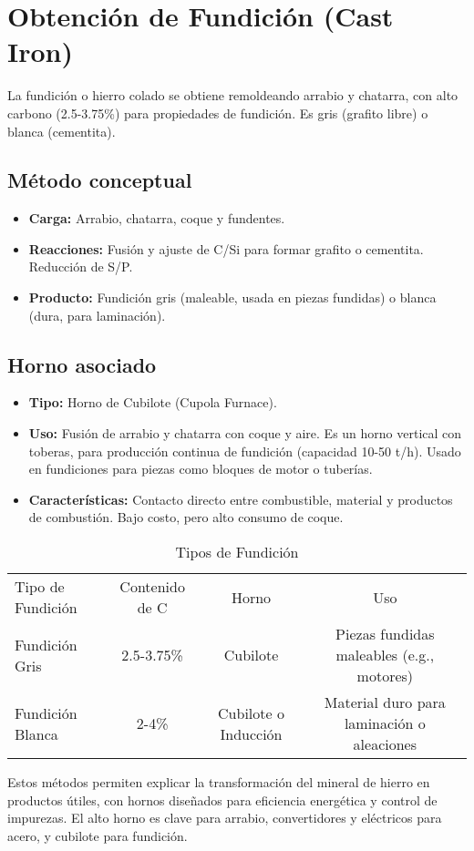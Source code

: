 \documentclass[12pt,a4paper]{article}
\begin{document}
\section{Obtención de Fundición (Cast Iron)}
La fundición o hierro colado se obtiene remoldeando arrabio y chatarra, con alto carbono (2.5-3.75\%) para propiedades de fundición. Es gris (grafito libre) o blanca (cementita).
\subsection{Método conceptual}
\begin{itemize}
\item \textbf{Carga:} Arrabio, chatarra, coque y fundentes.
\item \textbf{Reacciones:} Fusión y ajuste de C/Si para formar grafito o cementita. Reducción de S/P.
\item \textbf{Producto:} Fundición gris (maleable, usada en piezas fundidas) o blanca (dura, para laminación).
\end{itemize}
\subsection{Horno asociado}
\begin{itemize}
\item \textbf{Tipo:} Horno de Cubilote (Cupola Furnace).
\item \textbf{Uso:} Fusión de arrabio y chatarra con coque y aire. Es un horno vertical con toberas, para producción continua de fundición (capacidad 10-50 t/h). Usado en fundiciones para piezas como bloques de motor o tuberías.
\item \textbf{Características:} Contacto directo entre combustible, material y productos de combustión. Bajo costo, pero alto consumo de coque.
\end{itemize}
\begin{table}[h]
\centering
\caption{Tipos de Fundición}
\begin{tabular}{|l|c|c|c|}
Tipo de Fundición & Contenido de C & Horno & Uso \\
Fundición Gris & 2.5-3.75\% & Cubilote & Piezas fundidas maleables (e.g., motores) \\
Fundición Blanca & 2-4\% & Cubilote o Inducción & Material duro para laminación o aleaciones \\
\end{tabular}
\end{table}
Estos métodos permiten explicar la transformación del mineral de hierro en productos útiles, con hornos diseñados para eficiencia energética y control de impurezas. El alto horno es clave para arrabio, convertidores y eléctricos para acero, y cubilote para fundición.
\end{document}

